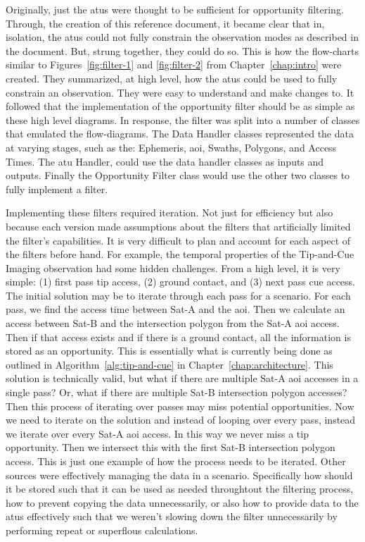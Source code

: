 Originally, just the \glspl{atu} were thought to be sufficient for opportunity
filtering. Through, the creation of this reference document, it became clear
that in, isolation, the \glspl{atu} could not fully constrain the observation
modes as described in the document. But, strung together, they could do so.
This is how the flow-charts similar to Figures~\ref{fig:filter-1} and
\ref{fig:filter-2} from Chapter~\ref{chap:intro} were created. They summarized,
at high level, how the \glspl{atu} could be used to fully constrain an
observation. They were easy to understand and make changes to. It followed that
the implementation of the opportunity filter should be as simple as these high
level diagrams. In response, the filter was split into a number of classes that
emulated the flow-diagrams. The Data Handler classes represented the data at
varying stages, such as the: Ephemeris, \gls{aoi}, Swaths, Polygons, and Access
Times. The \gls{atu} Handler, could use the data handler classes as inputs and
outputs. Finally the Opportunity Filter class would use the other two classes
to fully implement a filter.  

Implementing these filters required iteration. Not just for efficiency but also
because each version made assumptions about the filters that artificially
limited the filter's capabilities.  It is very difficult to plan and account
for each aspect of the filters before hand.  For example, the temporal
properties of the Tip-and-Cue Imaging observation had some hidden challenges.
From a high level, it is very simple: (1) first pass tip access, (2) ground
contact, and (3) next pass cue access. The initial solution may be to iterate
through each pass for a scenario. For each pass, we find the access time
between Sat-A and the \gls{aoi}. Then we calculate an access between Sat-B and
the intersection polygon from the Sat-A \gls{aoi} access. Then if that access
exists and if there is a ground contact, all the information is stored as an
opportunity. This is essentially what is currently being done as outlined in
Algorithm~\ref{alg:tip-and-cue} in Chapter~\ref{chap:architecture}. This
solution is technically valid, but what if there are multiple Sat-A \gls{aoi}
accesses in a single pass? Or, what if there are multiple Sat-B intersection
polygon accesses? Then this process of iterating over passes may miss potential
opportunities. Now we need to iterate on the solution and instead of looping
over every pass, instead we iterate over every Sat-A \gls{aoi} access. In this
way we never miss a tip opportunity. Then we intersect this with the first
Sat-B intersection polygon access. This is just one example of how the process
needs to be iterated. Other sources were effectively managing the data in a
scenario. Specifically how should it be stored such that it can be used as
needed throughtout the filtering process, how to prevent copying the data
unnecessarily, or also how to provide data to the \glspl{atu} effectively such
that we weren't slowing down the filter unnecessarily by performing repeat or
superflous calculations.  

